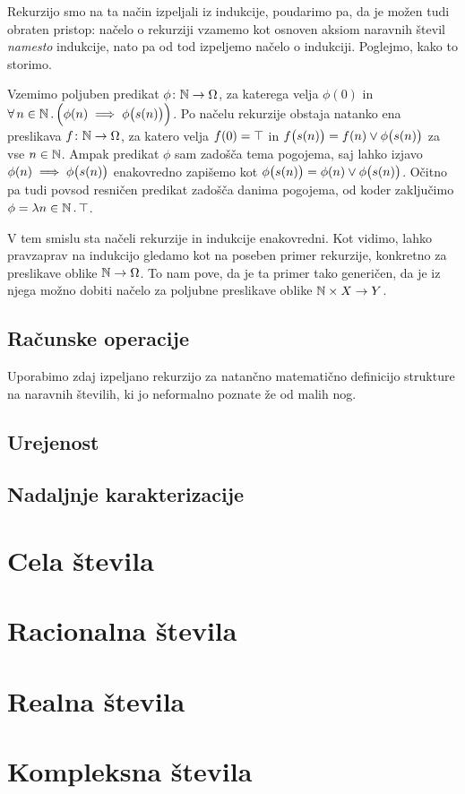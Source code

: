 Rekurzijo smo na ta način izpeljali iz indukcije, poudarimo pa, da je možen tudi obraten pristop: načelo o rekurziji vzamemo kot osnoven aksiom naravnih števil \emph{namesto} indukcije, nato pa od tod izpeljemo načelo o indukciji. Poglejmo, kako to storimo.

Vzemimo poljuben predikat $\phi\colon \mathbb{N} \to \Omega$, za katerega velja $\phi(0)$ in $\all[2]{n}[\NN]{\phi(n) \implies \phi\big(\suc[n]\big)}$. Po načelu rekurzije obstaja natanko ena preslikava $f\colon \mathbb{N} \to \Omega$, za katero velja $f(0) = \top$ in $f\big(\suc[n]\big) = f(n) \lor \phi\big(\suc[n]\big)$ za vse $n \in \mathbb{N}$. Ampak predikat $\phi$ sam zadošča tema pogojema, saj lahko izjavo $\phi(n) \implies \phi\big(\suc[n]\big)$ enakovredno zapišemo kot $\phi\big(\suc[n]\big) = \phi(n) \lor \phi\big(\suc[n]\big)$. Očitno pa tudi povsod resničen predikat zadošča danima pogojema, od koder zaključimo $\phi = \xlam{n}[\NN]{\true}$.

V tem smislu sta načeli rekurzije in indukcije enakovredni. Kot vidimo, lahko pravzaprav na indukcijo gledamo kot na poseben primer rekurzije, konkretno za preslikave oblike $\mathbb{N} \to \Omega$. To nam pove, da je ta primer tako generičen, da je iz njega možno dobiti načelo za poljubne preslikave oblike $\mathbb{N} \times X \to Y$.

\subsection{Računske operacije}

Uporabimo zdaj izpeljano rekurzijo za natančno matematično definicijo strukture na naravnih številih, ki jo neformalno poznate že od malih nog.


\subsection{Urejenost}
\subsection{Nadaljnje karakterizacije}


\section{Cela števila}
\section{Racionalna števila}
\section{Realna števila}
\section{Kompleksna števila}




